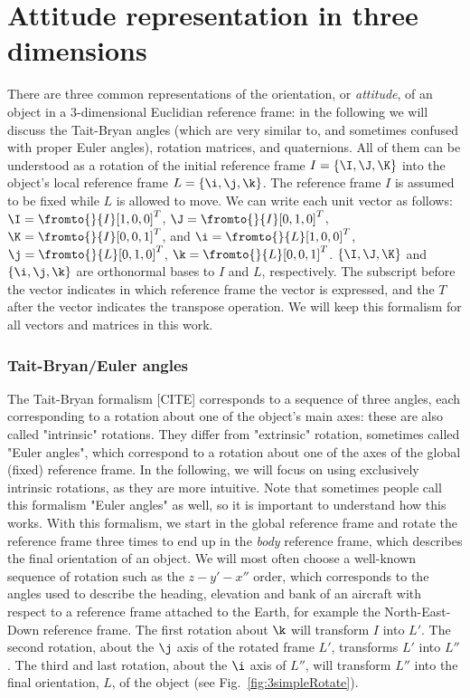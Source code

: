 \chapter{Attitude representation in three dimensions}
\label{sec:attituderepresentation}

There are three common representations of the orientation, or \textit{attitude}, of an object in a 3-dimensional Euclidian reference frame: in the following we will discuss the Tait-Bryan angles (which are very similar to, and sometimes confused with proper Euler angles), rotation matrices, and quaternions. All of them can be understood as a rotation of the initial reference frame $I = \{\I,\J,\K\}$ into the object's local reference frame $L = \{\i,\j,\k\}$. The reference frame $I$ is assumed to be fixed while $L$ is allowed to move. We can write each unit vector as follows: $\I = \fromto{}{I}[1,0,0]^T$, $\J = \fromto{}{I}[0,1,0]^T$, $\K = \fromto{}{I}[0,0,1]^T$, and $\i = \fromto{}{L}[1,0,0]^T$, $\j = \fromto{}{L}[0,1,0]^T$, $\k = \fromto{}{L}[0,0,1]^T$. $\{\I,\J,\K\}$ and $\{\i,\j,\k\}$ are  orthonormal bases to $I$ and $L$, respectively. The subscript before the vector indicates in which reference frame the vector is expressed, and the $T$ after the vector indicates the transpose operation. We will keep this formalism for all vectors and matrices in this work.

\subsection{Tait-Bryan/Euler angles}
\label{subsec:Tait-Bryan}
The Tait-Bryan formalism [CITE] corresponds to a sequence of three angles, each corresponding to a rotation about one of the object's main axes: these are also called "intrinsic" rotations. They differ from "extrinsic" rotation, sometimes called "Euler angles", which correspond to a rotation about one of the axes of the global (fixed) reference frame. In the following, we will focus on using exclusively intrinsic rotations, as they are more intuitive. Note that sometimes people call this formalism "Euler angles" as well, so it is important to understand how this works.
With this formalism, we start in the global reference frame and rotate the reference frame three times to end up in the 
\textit{body} reference frame, which describes the final orientation of an object. We will most often choose a well-known sequence of rotation such as the $z-y'-x''$ order, which corresponds to the angles used to describe the heading, elevation and bank of an aircraft with respect to a reference frame attached to the Earth, for example the North-East-Down reference frame. The first rotation about $\k$ will transform $I$ into $L'$. The second rotation, about the $\j$ axis of the rotated frame $L'$, transforms $L'$ into $L''$. The third and last rotation, about the $\i$ axis of $L''$, will transform $L''$ into the final orientation, $L$, of the object (see Fig.~\ref{fig:3simpleRotate}).

